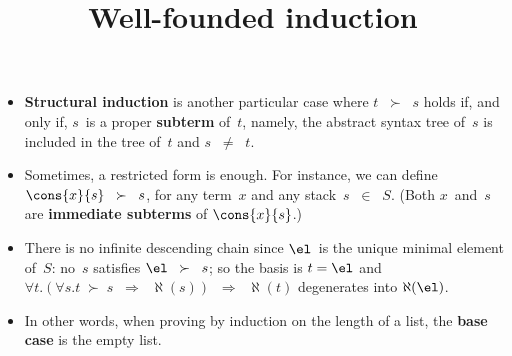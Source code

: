 \documentclass[wide]{slides}
\begin{document}
\begin{slide}
  \title{Well\hyp{}founded induction}

  \begin{itemize}

    \item \textbf{Structural induction} is another particular case
      where \(t \;\; \succ \;\; s\) holds if, and only if, \(s\)~is a
      proper \textbf{subterm} of~\(t\), namely, the abstract syntax
      tree of~\(s\) is included in the tree of~\(t\) and \(s \;\; \neq
      \;\; t\).

    \item Sometimes, a restricted form is enough. For instance, we can
      define \(\cons{x}{s} \;\; \succ \;\; s\), for any term~\(x\) and
      any stack~\(s \;\; \in \;\; S\). (Both \(x\)~and~\(s\) are
      \textbf{immediate subterms} of \(\cons{x}{s}\).)

    \item There is no infinite descending chain since \(\el\)~is the
      unique minimal element of~\(S\): no~\(s\) satisfies \(\el \;\;
      \succ \;\; s\); so the basis is \(t=\el\) and \(\forall
      t.(\forall s.t \; \succ \; s \;\; \Rightarrow \;\; \aleph(s))
      \;\; \Rightarrow \;\; \aleph(t)\) degenerates into
      \(\aleph(\el)\).

    \item In other words, when proving by induction on the length of a
      list, the \textbf{base case} is the empty list.

  \end{itemize}

\end{slide}
\end{document}
